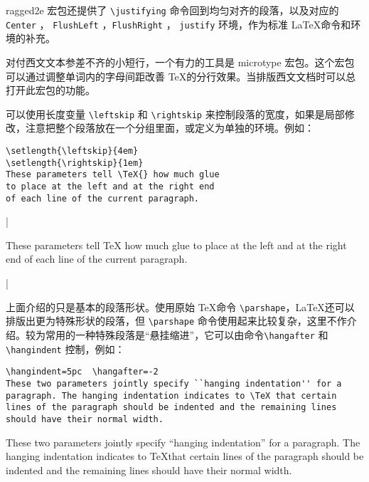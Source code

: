 ragged2e 宏包还提供了 \verb|\justifying| 命令回到均匀对齐的段落，以及对应的 \verb|Center| ， \verb|FlushLeft| ，\verb|FlushRight| ， \verb|justify| 环境，作为标准 \LaTeX 命令和环境的补充。

对付西文文本参差不齐的小短行，一个有力的工具是 microtype 宏包。这个宏包可以通过调整单词内的字母间距改善 \TeX 的分行效果。当排版西文文档时可以总打开此宏包的功能。

可以使用长度变量 \verb|\leftskip| 和 \verb|\rightskip| 来控制段落的宽度，如果是局部修改，注意把整个段落放在一个分组里面，或定义为单独的环境。例如：

\begin{minipage}[t]{0.45\textwidth}
\begin{lstlisting}
\setlength{\leftskip}{4em}
\setlength{\rightskip}{1em}
These parameters tell \TeX{} how much glue
to place at the left and at the right end
of each line of the current paragraph.
\end{lstlisting}
\end{minipage}
\hfill
|
\begin{minipage}[t]{0.45\textwidth}
    \setlength{\leftskip}{4em}
    \setlength{\rightskip}{1em}
    These parameters tell \TeX{} how much glue
    to place at the left and at the right end
    of each line of the current paragraph.
\end{minipage}
|

上面介绍的只是基本的段落形状。使用原始 \TeX 命令 \verb|\parshape|，\LaTeX 还可以排版出更为特殊形状的段落，但
\verb|\parshape| 命令使用起来比较复杂，这里不作介绍。较为常用的一种特殊段落是“悬挂缩进”，它可以由命令\verb|\hangafter| 和 \verb|\hangindent| 控制，例如：

\begin{minipage}[t]{0.45\textwidth}
\begin{lstlisting}
\hangindent=5pc  \hangafter=-2
These two parameters jointly specify ``hanging indentation'' for a paragraph. The hanging indentation indicates to \TeX that certain lines of the paragraph should be indented and the remaining lines should have their normal width.
\end{lstlisting}
\end{minipage}
\hfill
\begin{minipage}[t]{0.45\textwidth}
    \hangindent=5pc  
    These two parameters jointly specify ``hanging indentation'' for a paragraph. The hanging indentation indicates to \TeX that certain lines of the paragraph should be indented and the remaining lines should have their normal width.
\end{minipage}

